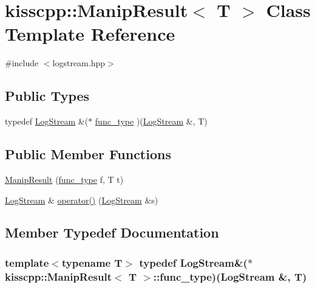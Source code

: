 \hypertarget{classkisscpp_1_1_manip_result}{\section{kisscpp\-:\-:Manip\-Result$<$ T $>$ Class Template Reference}
\label{classkisscpp_1_1_manip_result}
}


{\ttfamily \#include $<$logstream.\-hpp$>$}

\subsection*{Public Types}
\begin{DoxyCompactItemize}
\item 
typedef \hyperlink{classkisscpp_1_1_log_stream}{Log\-Stream} \&($\ast$ \hyperlink{classkisscpp_1_1_manip_result_a5948a01e3f4c7a21c7e15320b570a37a}{func\-\_\-type} )(\hyperlink{classkisscpp_1_1_log_stream}{Log\-Stream} \&, T)
\end{DoxyCompactItemize}
\subsection*{Public Member Functions}
\begin{DoxyCompactItemize}
\item 
\hyperlink{classkisscpp_1_1_manip_result_a6e6d19e8dfc6691db531c3a753b1fd5f}{Manip\-Result} (\hyperlink{classkisscpp_1_1_manip_result_a5948a01e3f4c7a21c7e15320b570a37a}{func\-\_\-type} f, T t)
\item 
\hyperlink{classkisscpp_1_1_log_stream}{Log\-Stream} \& \hyperlink{classkisscpp_1_1_manip_result_adedf89338ced5430d3d35dbe49cdaee8}{operator()} (\hyperlink{classkisscpp_1_1_log_stream}{Log\-Stream} \&s)
\end{DoxyCompactItemize}


\subsection{Member Typedef Documentation}
\hypertarget{classkisscpp_1_1_manip_result_a5948a01e3f4c7a21c7e15320b570a37a}{
\subsubsection[{func\-\_\-type}]{\setlength{\rightskip}{0pt plus 5cm}template$<$typename T$>$ typedef {\bf Log\-Stream}\&($\ast$ {\bf kisscpp\-::\-Manip\-Result}$<$ T $>$\-::func\-\_\-type)({\bf Log\-Stream} \&, T)}}\label{classkisscpp_1_1_manip_result_a5948a01e3f4c7a21c7e15320b570a37a}


